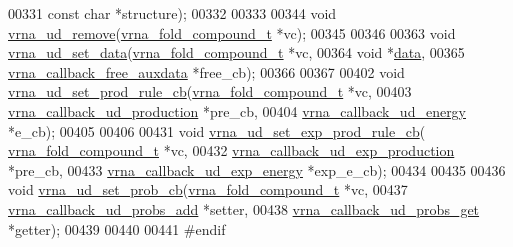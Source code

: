 \begin{DoxyCode}
00331                       \textcolor{keyword}{const} \textcolor{keywordtype}{char}            *structure);
00332 
00333 
00344 \textcolor{keywordtype}{void}  \hyperlink{group__domains__up_gada59cb0c498b812eadd010811af3f2d4}{vrna\_ud\_remove}(\hyperlink{group__fold__compound_structvrna__fc__s}{vrna\_fold\_compound\_t} *vc);
00345 
00346 
00363 \textcolor{keywordtype}{void}  \hyperlink{group__domains__up_gac1f18c312b91d80089534a87d956e58b}{vrna\_ud\_set\_data}(\hyperlink{group__fold__compound_structvrna__fc__s}{vrna\_fold\_compound\_t}       *vc,
00364                        \textcolor{keywordtype}{void}                       *\hyperlink{group__domains__up_a8802b1b0512999a9f35202031811ce17}{data},
00365                        \hyperlink{group__fold__compound_ga7806651f51b195013839a218b3bbd5a3}{vrna\_callback\_free\_auxdata} *free\_cb);
00366 
00367 
00402 \textcolor{keywordtype}{void} \hyperlink{group__domains__up_ga745a99f0bc72898d54de16f6e538828a}{vrna\_ud\_set\_prod\_rule\_cb}(\hyperlink{group__fold__compound_structvrna__fc__s}{vrna\_fold\_compound\_t}        *vc,
00403                               \hyperlink{group__domains__up_ga4fdfc02c1b660c07f2d887772f02a0a1}{vrna\_callback\_ud\_production} *pre\_cb,
00404                               \hyperlink{group__domains__up_ga75825c57d0bfde4ae4f95c044260c5c3}{vrna\_callback\_ud\_energy}     *e\_cb);
00405 
00406 
00431 \textcolor{keywordtype}{void}  \hyperlink{group__domains__up_ga2fb1db2099da26c76247e1209ad4aa09}{vrna\_ud\_set\_exp\_prod\_rule\_cb}(
      \hyperlink{group__fold__compound_structvrna__fc__s}{vrna\_fold\_compound\_t}             *vc,
00432                                    \hyperlink{group__domains__up_ga33d78327dcd04c1ca5ab2887edc18c7b}{vrna\_callback\_ud\_exp\_production}  *pre\_cb,
00433                                    \hyperlink{group__domains__up_ga861706f257ba993753464b823e65b86e}{vrna\_callback\_ud\_exp\_energy}      *exp\_e\_cb);
00434 
00435 
00436 \textcolor{keywordtype}{void}  \hyperlink{unstructured__domains_8h_a13ac877c9db89a1a5b5d9c0394148595}{vrna\_ud\_set\_prob\_cb}(\hyperlink{group__fold__compound_structvrna__fc__s}{vrna\_fold\_compound\_t}        *vc,
00437                           \hyperlink{group__domains__up_gab10498abc84fcaf336aca8f8d7d42eb2}{vrna\_callback\_ud\_probs\_add}  *setter,
00438                           \hyperlink{group__domains__up_gaa10ba1b6f1e179ea84c5caca9cdaae67}{vrna\_callback\_ud\_probs\_get}  *getter);
00439 
00440 
00441 \textcolor{preprocessor}{#endif}
\end{DoxyCode}
